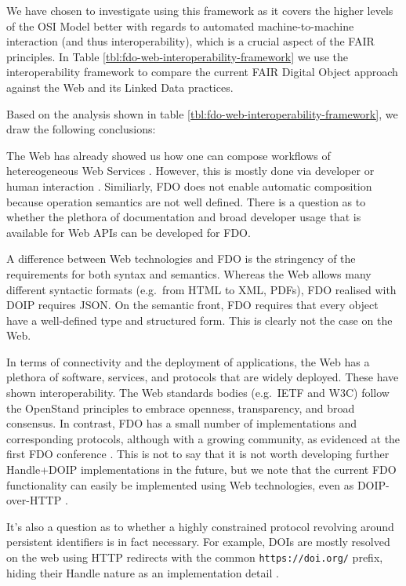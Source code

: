 \documentclass[fleqn,10pt,lineno]{wlpeerjlua}
\begin{document}
We have chosen to investigate using this framework as it covers the higher levels of the OSI Model \cite{8ZRGFa6y} better with regards to automated machine-to-machine interaction (and thus interoperability), which is a crucial aspect of the FAIR principles. In Table \ref{tbl:fdo-web-interoperability-framework} we use the interoperability framework to compare the current FAIR Digital Object approach against the Web and its Linked Data practices.



Based on the analysis shown in table \ref{tbl:fdo-web-interoperability-framework}, we draw the following conclusions:

The Web has already showed us how one can compose workflows of hetereogeneous Web Services \cite{39K3yHT3}. However, this is mostly done via developer or human interaction \cite{iYh1wFBt}. Similiarly, FDO does not enable automatic composition because operation semantics are not well defined. There is a question as to whether the plethora of documentation and broad developer usage that is available for Web APIs can be developed for FDO.

A difference between Web technologies and FDO is the stringency of the requirements for both syntax and semantics. Whereas the Web allows many different syntactic formats (e.g.~from HTML to XML, PDFs), FDO realised with DOIP requires JSON. On the semantic front, FDO requires that every object have a well-defined type and structured form. This is clearly not the case on the Web.

In terms of connectivity and the deployment of applications, the Web has a plethora of software, services, and protocols that are widely deployed. These have shown interoperability. The Web standards bodies (e.g.~IETF and W3C) follow the OpenStand principles \cite{hxtgCGjY} to embrace openness, transparency, and broad consensus. In contrast, FDO has a small number of implementations and corresponding protocols, although with a growing community, as evidenced at the first FDO conference \cite{jrZe6Esu}. This is not to say that it is not worth developing further Handle+DOIP implementations in the future, but we note that the current FDO functionality can easily be implemented using Web technologies, even as DOIP-over-HTTP \cite{p7nwRj8E}.

It's also a question as to whether a highly constrained protocol revolving around persistent identifiers is in fact necessary. For example, DOIs are mostly resolved on the web \cite{1H9iQhQYq} using HTTP redirects with the common \texttt{https://doi.org/} prefix, hiding their Handle nature as an implementation detail \cite{68fzID2k}.
\end{document}
